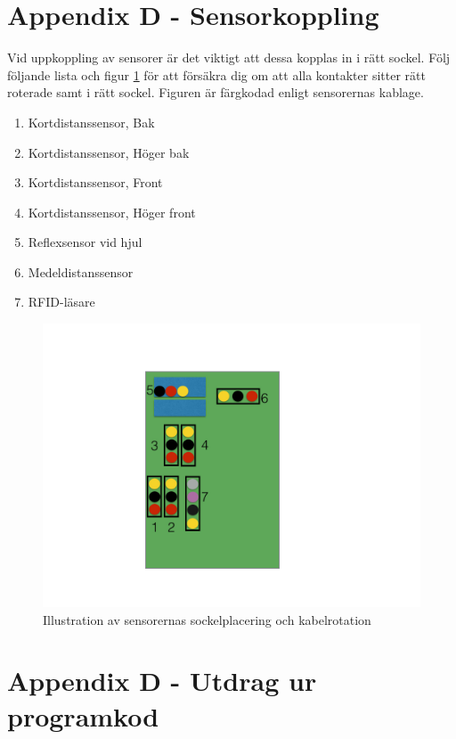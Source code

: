\documentclass[a4paper,12pt,fleqn]{article}
\begin{document}

\newpage
\section*{Appendix D - Sensorkoppling \label{head:sensorkoppl}}

Vid uppkoppling av sensorer är det viktigt att dessa kopplas in i rätt sockel. 
Följ följande lista och figur \ref{fig:sensorkoppling} för att försäkra dig om att alla kontakter sitter rätt roterade samt i rätt sockel. Figuren är färgkodad enligt sensorernas kablage. 

\begin{enumerate}
		\item Kortdistanssensor, Bak
		\item Kortdistanssensor, Höger bak
		\item Kortdistanssensor, Front
		\item Kortdistanssensor, Höger front
		\item Reflexsensor vid hjul
		\item Medeldistanssensor
		\item RFID-läsare
\end{enumerate}


\begin{figure}[htp] %
  \begin{center}
  \includegraphics[keepaspectratio=true,width=1\textwidth]{bilder/Sensorkoppling.jpg}  %
  \end{center}
  \caption{Illustration av sensorernas sockelplacering och kabelrotation} %
  \label{fig:sensorkoppling} %
\end{figure}


\newpage
\section*{Appendix D - Utdrag ur programkod}

\lstset{language=C++}

\end{document}
